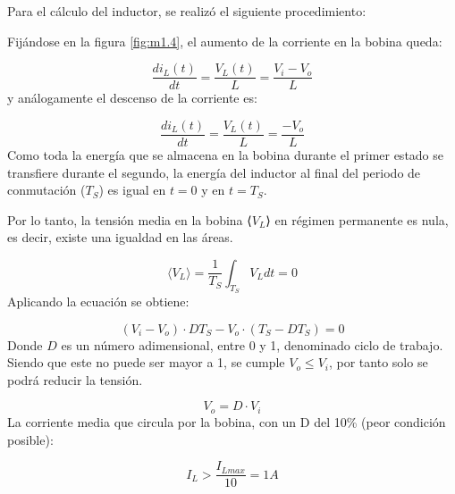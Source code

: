                 Para el cálculo del inductor, se realizó el siguiente procedimiento:\par
                Fijándose en la figura \ref{fig:m1.4}, el aumento de la corriente en la bobina queda:\par
                \begin{equation}
                    \frac{di_L(t)}{dt} = \frac{V_L(t)}{L} = \frac{V_i - V_o}{L}
                \end{equation}
                y análogamente el descenso de la corriente es:\par
                \begin{equation}
                    \frac{di_L(t)}{dt} = \frac{V_L(t)}{L} = \frac{-V_o}{L}
                \end{equation}
                Como toda la energía que se almacena en la bobina durante el primer estado se transfiere durante el segundo, la energía del inductor al final del periodo de conmutación ($T_S$) es igual en $t = 0$ y en $t = T_S$.\par
                Por lo tanto, la tensión media en la bobina ⟨$V_L$⟩ en régimen permanente es nula, es decir, existe una igualdad en las áreas.\par
                \begin{equation}
                    \langle V_L \rangle = \frac{1}{T_S}\int_{T_S} V_L dt = 0
                \end{equation}
                Aplicando la ecuación se obtiene:\par
                \begin{equation}
                    (V_i - V_o) \cdot DT_S - V_o \cdot (T_S - DT_S) = 0
                \end{equation}
                Donde $D$ es un número adimensional, entre 0 y 1, denominado ciclo de trabajo. Siendo que este no puede ser mayor a 1, se cumple $V_o \leq V_i$, por tanto solo se podrá reducir la tensión.\par
                \begin{equation}
                    V_o = D \cdot V_i
                    \label{eq:D}
                \end{equation}
                La corriente media que circula por la bobina, con un D del 10\% (peor condición posible):\par
                \begin{equation}
                    I_L > \frac{I_{Lmax}}{10} = 1A
                \end{equation}
                
